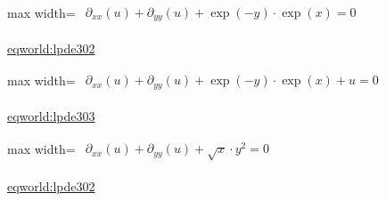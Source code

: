 \documentclass[10pt,a4paper]{article}
\begin{document}
\begin{minipage}{\linewidth}
\begin{center}\begin{adjustbox}{max width=\linewidth}$\displaystyle\begin{gathered}\begin{gathered}\partial_{xx}(u)+\partial_{yy}(u)+\exp(-y)\cdot \exp(x)=0\end{gathered}\end{gathered}$\end{adjustbox}\end{center}
{\small \href{https://eqworld.ipmnet.ru/en/solutions/lpde/lpde302.pdf}{eqworld:lpde302}}\par
\end{minipage}\par\vspace{7mm}

\begin{minipage}{\linewidth}
\begin{center}\begin{adjustbox}{max width=\linewidth}$\displaystyle\begin{gathered}\begin{gathered}\partial_{xx}(u)+\partial_{yy}(u)+\exp(-y)\cdot \exp(x)+u=0\end{gathered}\end{gathered}$\end{adjustbox}\end{center}
{\small \href{https://eqworld.ipmnet.ru/en/solutions/lpde/lpde303.pdf}{eqworld:lpde303}}\par
\end{minipage}\par\vspace{7mm}

\begin{minipage}{\linewidth}
\begin{center}\begin{adjustbox}{max width=\linewidth}$\displaystyle\begin{gathered}\begin{gathered}\partial_{xx}(u)+\partial_{yy}(u)+\sqrt{x}\cdot y^{2}=0\end{gathered}\end{gathered}$\end{adjustbox}\end{center}
{\small \href{https://eqworld.ipmnet.ru/en/solutions/lpde/lpde302.pdf}{eqworld:lpde302}}\par
\end{minipage}\par\vspace{7mm}
\end{document}
